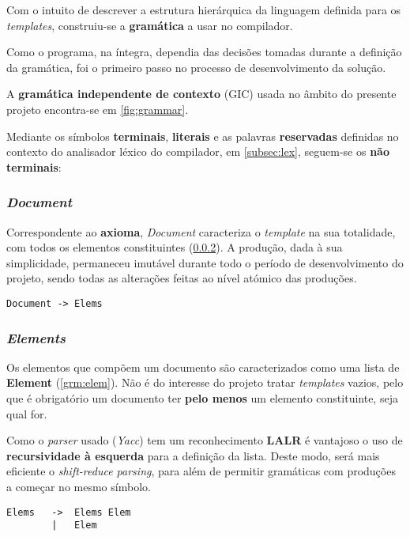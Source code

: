 \documentclass[../relatorio.tex]{subfiles}
\begin{document}
Com o intuito de descrever a estrutura hierárquica da linguagem
definida para os \textit{templates}, construiu-se a \textbf{gramática} 
a usar no compilador. 

Como o programa, na íntegra, dependia das decisões tomadas durante
a definição da gramática, foi o primeiro passo no processo de desenvolvimento
da solução.

A \textbf{gramática independente de contexto} (GIC) usada 
no âmbito do presente projeto encontra-se em \ref{fig:grammar}.

Mediante os símbolos \textbf{terminais}, \textbf{literais} e as palavras 
\textbf{reservadas} definidas no contexto do analisador léxico do 
compilador, em \ref{subsec:lex}, seguem-se os \textbf{não terminais}:

\subsubsection{\textit{Document}}\label{grm:doc}
Correspondente ao \textbf{axioma},
\textit{Document} caracteriza o \textit{template} na sua totalidade,
com todos os elementos constituintes (\ref{grm:elems}).
A produção, dada à sua simplicidade, permaneceu imutável durante todo o período de
desenvolvimento do projeto, sendo todas as alterações 
feitas ao nível atómico das produções.

\begin{verbatim}
Document -> Elems
\end{verbatim}

\subsubsection{\textit{Elements}} \label{grm:elems}
Os elementos que compõem um documento são caracterizados como uma lista 
de \textbf{Element} (\ref{grm:elem}). 
Não é do interesse do projeto tratar \textit{templates} vazios, pelo que 
é obrigatório um documento ter \textbf{pelo menos} um 
elemento constituinte, seja qual for. 

Como o \textit{parser} usado (\textit{Yacc}) tem um reconhecimento \textbf{LALR}
é vantajoso o uso de \textbf{recursividade à esquerda} para a definição da lista.
Deste modo, será mais eficiente o \textit{shift-reduce parsing}, para além
de permitir gramáticas com produções a começar no mesmo símbolo.

\begin{verbatim}
Elems   ->  Elems Elem
        |   Elem
\end{verbatim}
\end{document}

